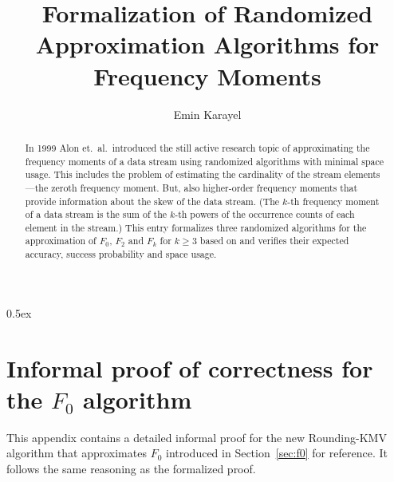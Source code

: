 \documentclass[11pt,a4paper]{article}
\begin{document}
\title{Formalization of Randomized Approximation Algorithms for Frequency Moments}
\author{Emin Karayel}
\maketitle
\begin{abstract}
In 1999 Alon et.\ al.\ introduced the still active research topic of approximating the frequency moments of a data stream using randomized algorithms with minimal space usage.
This includes the problem of estimating the cardinality of the stream elements---the zeroth frequency moment.
But, also higher-order frequency moments that provide information about the skew of the data stream.
(The $k$-th frequency moment of a data stream is the sum of the $k$-th powers of the occurrence counts of each element in the stream.)
This entry formalizes three randomized algorithms for the approximation of $F_0$, $F_2$ and $F_k$ for $k \geq 3$ based on \cite{alon1999,baryossef2002} and verifies their expected accuracy, success probability and space usage.
\end{abstract}

\tableofcontents

\parindent 0pt\parskip 0.5ex


\appendix
\section{Informal proof of correctness for the $F_0$ algorithm\label{sec:f0_proof}}
This appendix contains a detailed informal proof for the new Rounding-KMV algorithm that approximates $F_0$
introduced in Section~\ref{sec:f0} for reference. It follows the same reasoning as the formalized proof.
\end{document}
